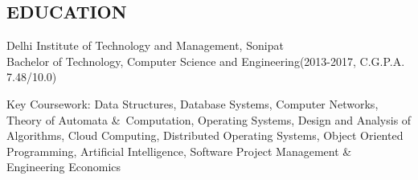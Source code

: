 \documentclass[margin]{res}
\begin{document}
\address { \href {mailto:divij.sehgaal7@gmail.com}{divij.sehgaal7@gmail.com} |  \href {http://www.linkedin.com/in/sehgaldivij/}{LinkedIn} | \href {https://goo.gl/8UEyxe} {https://goo.gl/8UEyxe}}
\begin{resume}

\section{EDUCATION}
				Delhi Institute of Technology and Management, Sonipat \\
                Bachelor of Technology, Computer Science and Engineering(2013-2017, C.G.P.A. 7.48/10.0)

				Key Coursework: Data Structures, Database Systems, Computer Networks, Theory of Automata \&\ Computation, Operating Systems, Design and Analysis of Algorithms, Cloud Computing, Distributed Operating Systems, Object Oriented Programming, Artificial Intelligence, Software Project Management \& Engineering Economics


\end{resume}
\end{document}
